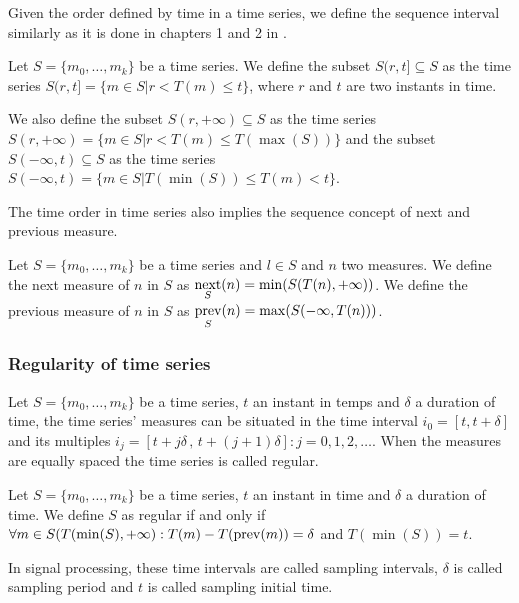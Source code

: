 Given the order defined by time in a time series, we define the
sequence interval similarly as it is done in chapters 1 and 2 in \cite{last}.

\begin{definition}
  Let $S=\{m_0, \ldots, m_k\}$ be a time series. We define the subset
  $S(r,t] \subseteq S$ as the time series $S(r,t]=\{m\in S |
  r<T(m)\leq t\}$, where $r$ and $t$ are two instants in time.

  We also define the subset $S(r,+\infty)\subseteq S$ as the time
  series $S(r,+\infty) = \{m\in S | r< T(m) \leq T(\max(S))\}$ and the
  subset $S(-\infty,t)\subseteq S$ as the time series $S(-\infty,t) =
  \{m\in S | T(\min(S))\leq T(m) < t\}$.
\end{definition}

The time order in time series also implies the sequence concept of
next and previous measure.

\begin{definition}
  Let $S=\{m_0, \ldots, m_k\}$ be a time series and $l\in S$ and $n$
  two measures. We define the next measure of $n$ in $S$ as
  $\operatorname*{next}\limits_S(n) = \min(S(T(n),+\infty))$. We define the previous
  measure of $n$ in $S$ as $\operatorname*{prev}\limits_S(n) =
  \max(S(-\infty,T(n)))$.
\end{definition}




\subsubsection{Regularity of time series} 

Let $S=\{m_0,\ldots,m_k\}$ be a time series, $t$ an instant in temps
and $\delta$ a duration of time, the time series' measures can be
situated in the time interval $i_0=[t,t+\delta]$ and its multiples
$i_j=[t+j\delta \,,\, t+(j+1)\delta]: j=0,1,2,\ldots$. When the
measures are equally spaced the time series is called regular.

\begin{definition}
  Let $S=\{m_0,\ldots,m_k\}$ be a time series, $t$ an instant in time
  and $\delta$ a duration of time. We define $S$ as regular if and
  only if $\forall m \in S(T(\min(S),+\infty):T(m) - T(\operatorname*{prev}(m)) =
  \delta$ and $T(\min(S))=t$.
\end{definition}

In signal processing, these time intervals are called sampling
intervals, $\delta$ is called sampling period and $t$ is called
sampling initial time.  


